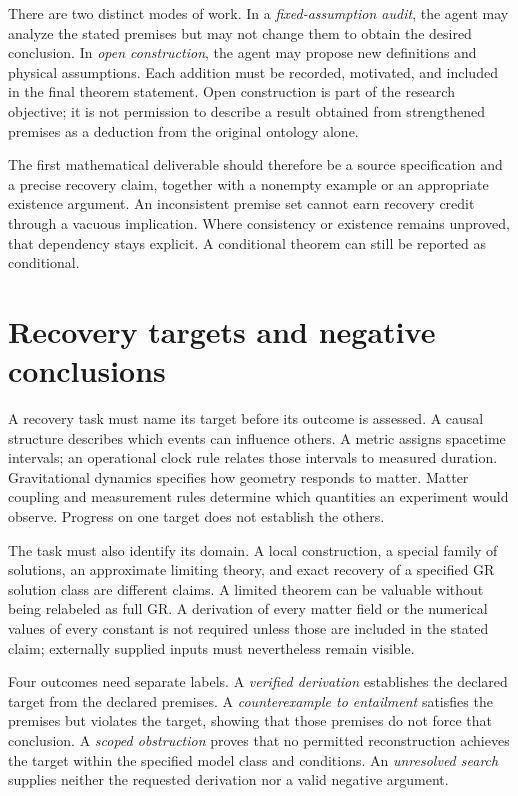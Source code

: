 \documentclass[11pt]{article}
\begin{document}
There are two distinct modes of work. In a \emph{fixed-assumption audit}, the agent may analyze the stated premises but may not change them to obtain the desired conclusion. In \emph{open construction}, the agent may propose new definitions and physical assumptions. Each addition must be recorded, motivated, and included in the final theorem statement. Open construction is part of the research objective; it is not permission to describe a result obtained from strengthened premises as a deduction from the original ontology alone.

The first mathematical deliverable should therefore be a source specification and a precise recovery claim, together with a nonempty example or an appropriate existence argument. An inconsistent premise set cannot earn recovery credit through a vacuous implication. Where consistency or existence remains unproved, that dependency stays explicit. A conditional theorem can still be reported as conditional.

\section{Recovery targets and negative conclusions}
A recovery task must name its target before its outcome is assessed. A causal structure describes which events can influence others. A metric assigns spacetime intervals; an operational clock rule relates those intervals to measured duration. Gravitational dynamics specifies how geometry responds to matter. Matter coupling and measurement rules determine which quantities an experiment would observe. Progress on one target does not establish the others.

The task must also identify its domain. A local construction, a special family of solutions, an approximate limiting theory, and exact recovery of a specified GR solution class are different claims. A limited theorem can be valuable without being relabeled as full GR. A derivation of every matter field or the numerical values of every constant is not required unless those are included in the stated claim; externally supplied inputs must nevertheless remain visible.

Four outcomes need separate labels. A \emph{verified derivation} establishes the declared target from the declared premises. A \emph{counterexample to entailment} satisfies the premises but violates the target, showing that those premises do not force that conclusion. A \emph{scoped obstruction} proves that no permitted reconstruction achieves the target within the specified model class and conditions. An \emph{unresolved search} supplies neither the requested derivation nor a valid negative argument.
\end{document}

